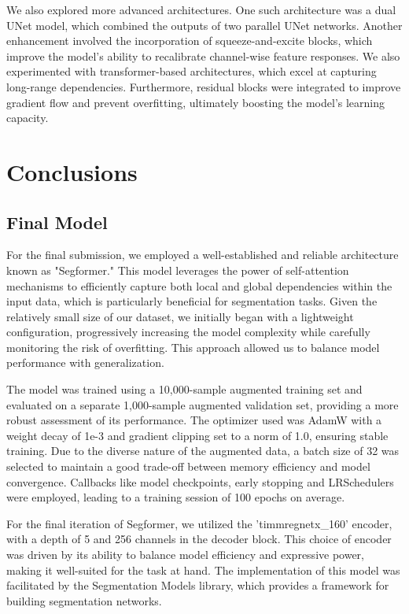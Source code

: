 \documentclass[11pt]{article}
\begin{document}
\begin{multicols}{2}
        We also explored more advanced architectures. One such architecture was a dual UNet model, which combined the outputs of two parallel UNet networks. Another enhancement involved the incorporation of squeeze-and-excite blocks, which improve the model's ability to recalibrate channel-wise feature responses. We also experimented with transformer-based architectures, which excel at capturing long-range dependencies. Furthermore, residual blocks were integrated to improve gradient flow and prevent overfitting, ultimately boosting the model's learning capacity.

        \section{Conclusions}
        \subsection{Final Model}
        For the final submission, we employed a well-established and reliable architecture known as "Segformer." This model leverages the power of self-attention mechanisms to efficiently capture both local and global dependencies within the input data, which is particularly beneficial for segmentation tasks. Given the relatively small size of our dataset, we initially began with a lightweight configuration, progressively increasing the model complexity while carefully monitoring the risk of overfitting. This approach allowed us to balance model performance with generalization.
        
        The model was trained using a 10,000-sample augmented training set and evaluated on a separate 1,000-sample augmented validation set, providing a more robust assessment of its performance. The optimizer used was AdamW with a weight decay of 1e-3 and gradient clipping set to a norm of 1.0, ensuring stable training. Due to the diverse nature of the augmented data, a batch size of 32 was selected to maintain a good trade-off between memory efficiency and model convergence. Callbacks like model checkpoints, early stopping and LRSchedulers were employed, leading to a training session of 100 epochs on average. 
        
        For the final iteration of Segformer, we utilized the 'timm\-regnetx\_160' encoder, with a depth of 5 and 256 channels in the decoder block. This choice of encoder was driven by its ability to balance model efficiency and expressive power, making it well-suited for the task at hand. The implementation of this model was facilitated by the Segmentation Models library\cite{qubvel2024}, which provides a framework for building segmentation networks.


\end{multicols}
\end{document}
